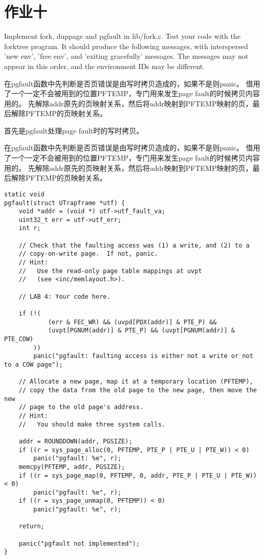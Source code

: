 \documentclass[12pt,a4paper]{article}
\begin{document}
\section{作业十}

Implement fork, duppage and pgfault in lib/fork.c. Test your code with the forktree program. 
It should produce the following messages, with interspersed 'new env', 'free env', and 'exiting gracefully' messages. 
The messages may not appear in this order, and the environment IDs may be different.

在pgfault函数中先判断是否页错误是由写时拷贝造成的，如果不是则panic。
借用了一个一定不会被用到的位置PFTEMP，专门用来发生page fault的时候拷贝内容用的。
先解除addr原先的页映射关系，然后将addr映射到PFTEMP映射的页，最后解除PFTEMP的页映射关系。 

首先是pgfault处理page fault时的写时拷贝。

在pgfault函数中先判断是否页错误是由写时拷贝造成的，如果不是则panic。
借用了一个一定不会被用到的位置PFTEMP，专门用来发生page fault的时候拷贝内容用的。
先解除addr原先的页映射关系，然后将addr映射到PFTEMP映射的页，最后解除PFTEMP的页映射关系。

\begin{lstlisting}[style=CPP]
static void
pgfault(struct UTrapframe *utf) {
    void *addr = (void *) utf->utf_fault_va;
    uint32_t err = utf->utf_err;
    int r;

    // Check that the faulting access was (1) a write, and (2) to a
    // copy-on-write page.  If not, panic.
    // Hint:
    //   Use the read-only page table mappings at uvpt
    //   (see <inc/memlayout.h>).

    // LAB 4: Your code here.

    if (!(
            (err & FEC_WR) && (uvpd[PDX(addr)] & PTE_P) &&
            (uvpt[PGNUM(addr)] & PTE_P) && (uvpt[PGNUM(addr)] & PTE_COW)
        ))
        panic("pgfault: faulting access is either not a write or not to a COW page");

    // Allocate a new page, map it at a temporary location (PFTEMP),
    // copy the data from the old page to the new page, then move the new
    // page to the old page's address.
    // Hint:
    //   You should make three system calls.

    addr = ROUNDDOWN(addr, PGSIZE);
    if ((r = sys_page_alloc(0, PFTEMP, PTE_P | PTE_U | PTE_W)) < 0)
        panic("pgfault: %e", r);
    memcpy(PFTEMP, addr, PGSIZE);
    if ((r = sys_page_map(0, PFTEMP, 0, addr, PTE_P | PTE_U | PTE_W)) < 0)
        panic("pgfault: %e", r);
    if ((r = sys_page_unmap(0, PFTEMP)) < 0)
        panic("pgfault: %e", r);

    return;

    panic("pgfault not implemented");
}
\end{lstlisting}
\end{document}
